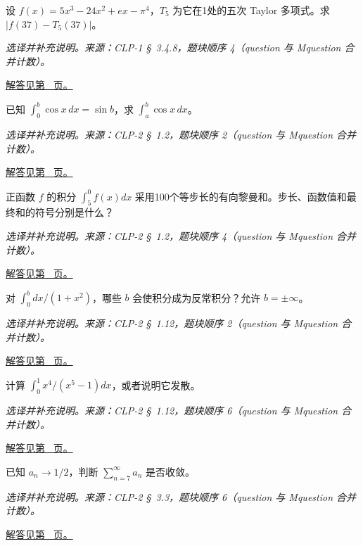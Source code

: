 \documentclass[12pt,fontset=fandol]{ctexart}
\begin{document}
\begin{example}\label{ex:c45q6}
设 $f(x)=5x^3-24x^2+ex-\pi^4$，$T_5$ 为它在1处的五次 Taylor 多项式。求 $|f(37)-T_5(37)|$。
\par\textit{选译并补充说明。来源：CLP-1 \S~3.4.8，题块顺序 4（question 与 Mquestion 合并计数）。}\par\hyperref[ans:c45q6]{解答见第~\pageref{ans:c45q6} 页。}
\end{example}
\begin{example}[定积分区间的可加性]\label{ex:c45q7}
已知 $\int_0^b\cos x\,dx=\sin b$，求 $\int_a^b\cos x\,dx$。
\par\textit{选译并补充说明。来源：CLP-2 \S~1.2，题块顺序 2（question 与 Mquestion 合并计数）。}\par\hyperref[ans:c45q7]{解答见第~\pageref{ans:c45q7} 页。}
\end{example}
\begin{example}[反向积分中的符号]\label{ex:c45q8}
正函数 $f$ 的积分 $\int_5^0f(x)dx$ 采用100个等步长的有向黎曼和。步长、函数值和最终和的符号分别是什么？
\par\textit{选译并补充说明。来源：CLP-2 \S~1.2，题块顺序 4（question 与 Mquestion 合并计数）。}\par\hyperref[ans:c45q8]{解答见第~\pageref{ans:c45q8} 页。}
\end{example}
\begin{example}[连续被积函数何时产生反常积分]\label{ex:c45q9}
对 $\int_0^b dx/(1+x^2)$，哪些 $b$ 会使积分成为反常积分？允许 $b=\pm\infty$。
\par\textit{选译并补充说明。来源：CLP-2 \S~1.12，题块顺序 2（question 与 Mquestion 合并计数）。}\par\hyperref[ans:c45q9]{解答见第~\pageref{ans:c45q9} 页。}
\end{example}
\begin{example}[不能直接跨过对数奇点]\label{ex:c45q10}
计算 $\int_0^1x^4/(x^5-1)dx$，或者说明它发散。
\par\textit{选译并补充说明。来源：CLP-2 \S~1.12，题块顺序 6（question 与 Mquestion 合并计数）。}\par\hyperref[ans:c45q10]{解答见第~\pageref{ans:c45q10} 页。}
\end{example}
\begin{example}[非零通项极限]\label{ex:c45q11}
已知 $a_n\to1/2$，判断 $\sum_{n=7}^\infty a_n$ 是否收敛。
\par\textit{选译并补充说明。来源：CLP-2 \S~3.3，题块顺序 6（question 与 Mquestion 合并计数）。}\par\hyperref[ans:c45q11]{解答见第~\pageref{ans:c45q11} 页。}
\end{example}
\end{document}

